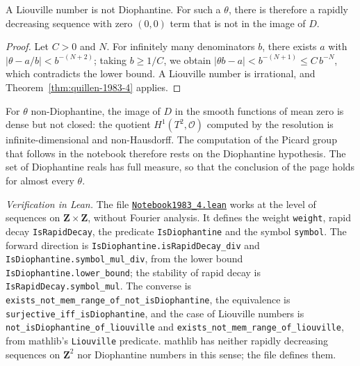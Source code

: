 \begin{proposition}\label{prop:quillen-1983-4-liouville}
A Liouville number is not Diophantine. For such a $\theta$, there is therefore a rapidly decreasing sequence with zero $(0,0)$ term that is not in the image of $D$.
\end{proposition}

\begin{proof}
Let $C > 0$ and $N$. For infinitely many denominators $b$, there exists $a$ with $|\theta - a/b| < b^{-(N+2)}$; taking $b \ge 1/C$, we obtain $|\theta b - a| < b^{-(N+1)} \le C\,b^{-N}$, which contradicts the lower bound. A Liouville number is irrational, and Theorem~\ref{thm:quillen-1983-4} applies.
\end{proof}

\begin{remarque}
For $\theta$ non-Diophantine, the image of $D$ in the smooth functions of mean zero is dense but not closed: the quotient $H^1(T^2, \mathcal O)$ computed by the resolution is infinite-dimensional and non-Hausdorff. The computation of the Picard group that follows in the notebook therefore rests on the Diophantine hypothesis. The set of Diophantine reals has full measure, so that the conclusion of the page holds for almost every $\theta$.
\end{remarque}

\begin{sloppypar}
\noindent\emph{Verification in Lean.} The file \href{\leanblobmain/Notebook1983_4.lean}{\texttt{Notebook1983\_4.\allowbreak{}lean}} works at the level of sequences on $\mathbf Z \times \mathbf Z$, without Fourier analysis. It defines the weight \texttt{weight}, rapid decay \texttt{IsRapidDecay}, the predicate \texttt{IsDiophantine} and the symbol \texttt{symbol}. The forward direction is \texttt{IsDiophantine.isRapidDecay\_div} and \texttt{IsDiophantine.symbol\_mul\_div}, from the lower bound \texttt{IsDiophantine.lower\_bound}; the stability of rapid decay is \texttt{IsRapidDecay.symbol\_mul}. The converse is \texttt{exists\_not\_mem\_range\_of\_not\_isDiophantine}, the equivalence is \texttt{surjective\_iff\_isDiophantine}, and the case of Liouville numbers is \texttt{not\_isDiophantine\_of\_liouville} and \texttt{exists\_not\_mem\_range\_of\_liouville}, from mathlib's \texttt{Liouville} predicate. mathlib has neither rapidly decreasing sequences on $\mathbf Z^2$ nor Diophantine numbers in this sense; the file defines them.
\end{sloppypar}

